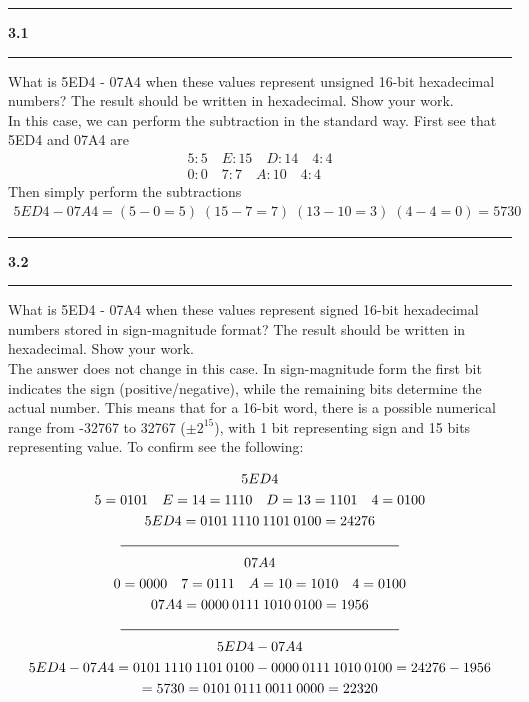 \documentclass[11pt]{article}
\newcommand\question[2]{\vspace{.25in}\hrule\textbf{#1 #2}\vspace{.5em}\hrule\vspace{.10in}}
\begin{document}
\raggedright
\newcommand\NAME{Sean Connor}  %
\newcommand\HWNUM{2}              %

\question{3.1}{} 
What is 5ED4 - 07A4 when these values represent unsigned 16-bit hexadecimal numbers? The result should be written in hexadecimal. Show your work.\\[1em]

In this case, we can perform the subtraction in the standard way. First see that 5ED4 and 07A4 are
\begin{gather*}
5:5\quad E:15\quad D:14\quad 4:4 \\
0:0\quad 7:7\quad A:10\quad 4:4
\end{gather*}
Then simply perform the subtractions
\begin{gather*}
5ED4 - 07A4 = (5 - 0 = 5) \; (15 - 7 = 7) \; (13 - 10 = 3) \; (4 - 4 = 0) = 5730
\end{gather*}

\question{3.2}{}
What is 5ED4 - 07A4  when these values represent signed 16-bit hexadecimal numbers stored in sign-magnitude format? The result should be written in hexadecimal. Show your work.\\[1em]

The answer does not change in this case. In sign-magnitude form the first bit indicates the sign (positive/negative), while the remaining bits determine the actual number. This means that for a 16-bit word, there is a possible numerical range from -32767 to 32767 ($\pm 2^{15}$), with 1 bit representing sign and 15 bits representing value. To confirm see the following:

\begin{gather*}
5ED4 \\
5 = 0101 \quad E = 14 = 1110 \quad D = 13 = 1101 \quad 4 = 0100 \\
5ED4 = 0101 \: 1110 \: 1101 \: 0100 = 24276 \\
\rule{7cm}{.5pt} \\
07A4 \\
0 = 0000 \quad 7 = 0111 \quad A = 10 = 1010 \quad 4 = 0100 \\
07A4 = 0000 \: 0111 \: 1010 \: 0100 = 1956 \\
\rule{7cm}{.5pt} \\
5ED4 - 07A4 \\
5ED4 - 07A4 = 0101 \: 1110 \: 1101 \: 0100 -  0000 \: 0111 \: 1010 \: 0100 = 24276 - 1956 \\
= 5730 =  0101 \: 0111 \: 0011 \: 0000 = 22320
\end{gather*}
\end{document}
